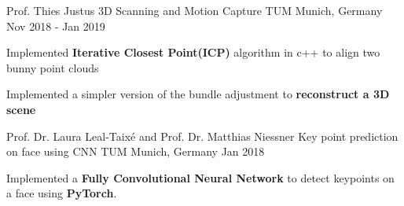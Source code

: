 \begin{cventries}
	\cventry
	{Prof. Thies Justus} %
	{3D Scanning and Motion Capture} %
	{TUM Munich, Germany} %
	{Nov 2018 - Jan 2019} %
	{
		\begin{cvitems} %
			\item {Implemented \textbf{Iterative Closest Point(ICP)} algorithm in c++ to align two bunny point clouds}
			\item {Implemented a simpler version of the bundle adjustment to \textbf{reconstruct a 3D scene}}
		\end{cvitems}
	}

	\cventry
	{Prof. Dr. Laura Leal-Taixé and Prof. Dr. Matthias Niessner} %
	{Key point prediction on face using CNN} %
	{TUM Munich, Germany} %
	{Jan 2018} %
	{
		\begin{cvitems} %
			\item {Implemented a \textbf{Fully Convolutional Neural Network} to detect keypoints on a face using \textbf{PyTorch}.}
		\end{cvitems}
	}


\end{cventries}
